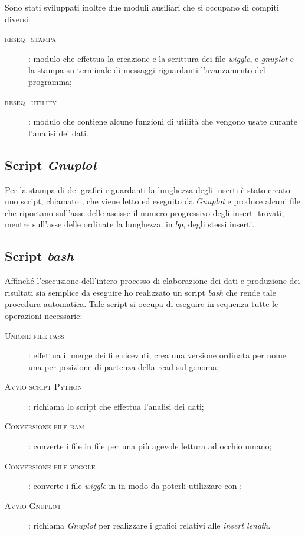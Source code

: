 Sono stati sviluppati inoltre due moduli ausiliari che si occupano di compiti diversi:
\begin{description}
\item[\textsc{reseq\_stampa}]: modulo che effettua la creazione e la scrittura dei file \emph{wiggle},  e \emph{gnuplot} e la stampa su terminale di messaggi riguardanti l'avanzamento del programma;

\item[\textsc{reseq\_utility}]: modulo che contiene alcune funzioni di utilità che vengono usate durante l'analisi dei dati.
\end{description}

\subsection{Script \emph{Gnuplot}}
Per la stampa di dei grafici riguardanti la lunghezza degli inserti è stato creato uno script, chiamato , che viene letto ed eseguito da \emph{Gnuplot} e produce alcuni file  che riportano sull'asse delle ascisse il numero progressivo degli inserti trovati, mentre sull'asse delle ordinate la lunghezza, in $bp$, degli stessi inserti.

\subsection{Script \emph{bash}}
\label{sec:bash}
Affinché l'esecuzione dell'intero processo di elaborazione dei dati e produzione dei risultati sia semplice da eseguire ho realizzato un script \emph{bash} che rende tale procedura automatica.
Tale script si occupa di eseguire in sequenza tutte le operazioni necessarie:

\begin{description}
\item[\textsc{Unione file pass}]: effettua il merge dei file  ricevuti; crea una versione ordinata per nome una per posizione di partenza della read sul genoma;
\item[\textsc{Avvio script Python}]: richiama lo script  che effettua l'analisi dei dati;
\item[\textsc{Conversione file bam}]: converte i file  in file  per una più agevole lettura ad occhio umano;
\item[\textsc{Conversione file wiggle}]: converte i file \emph{wiggle} in  in modo da poterli utilizzare con ;
\item[\textsc{Avvio Gnuplot}]: richiama \emph{Gnuplot} per realizzare i grafici relativi alle \emph{insert length}.
\end{description}



